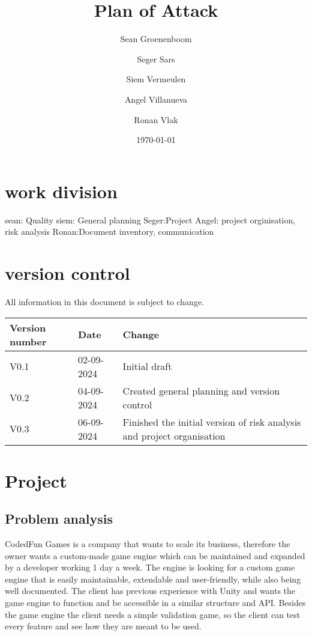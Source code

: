 \documentclass{article} %
\title{Plan of Attack} %
\author{Sean Groenenboom \and Seger Sars \and Siem Vermeulen \and Angel Villanueva \and Ronan Vlak} %
\date{\today} %
\begin{document}
\maketitle %
\newpage

\tableofcontents %
\newpage

\section{work division}
sean: Quality
siem: General planning
Seger:Project
Angel: project orginisation, risk analysis
Ronan:Document inventory, communication
\newpage

    \section{version control}
    All information in this document is subject to change. \\
    \begin{tabularx}{\textwidth}{|X|X|X|}
        \hline
        \textbf{Version number} & \textbf{Date} & \textbf{Change} \\ \hline
        V0.1 & 02-09-2024 & Initial draft \\ \hline
        V0.2 & 04-09-2024 & Created general planning and version control \\ \hline
        V0.3 & 06-09-2024 & Finished the initial version of risk analysis and project organisation \\ \hline
        \end{tabularx}
    \newpage
            
    \section{Project}
    \subsection{Problem analysis}
    CodedFun Games is a company that wants to scale its business, therefore
    the owner wants a custom-made game engine which can be maintained and expanded by a developer working 1 day a week.
    The engine is looking for a custom game engine that is easily maintainable, extendable and user-friendly, while also being well documented.
    The client has previous experience with Unity and wants the game engine to function and be accessible in a similar structure and API.
    \newline \newline
    Besides the game engine the client needs a simple validation game, so the client can test every feature and see how they are meant to be used.
\end{document}
